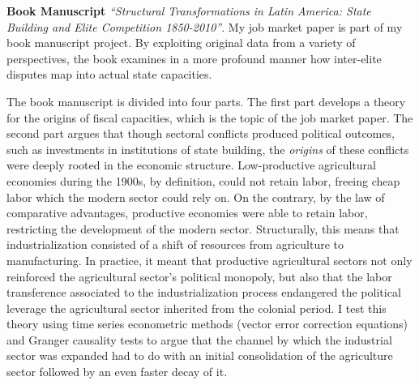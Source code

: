 \documentclass[11pt]{letter} %
\begin{document}
\begin{letter}{}
{\bf Book Manuscript} \emph{``Structural Transformations in Latin America: State Building and Elite Competition 1850-2010''}. My job market paper is part of my book manuscript project. By exploiting original data from a variety of perspectives, the book examines in a more profound manner how inter-elite disputes map into actual state capacities.

The book manuscript is divided into four parts. The first part develops a theory for the origins of fiscal capacities, which is the topic of the job market paper. The second part argues that though sectoral conflicts produced political outcomes, such as investments in institutions of state building, the \emph{origins} of these conflicts were deeply rooted in the economic structure. Low-productive agricultural economies during the 1900s, by definition, could not retain labor, freeing cheap labor which the modern sector could rely on. On the contrary, by the law of comparative advantages, productive economies were able to retain labor, restricting the development of the modern sector. Structurally, this means that industrialization consisted of a shift of resources from agriculture to manufacturing. In practice, it meant that productive agricultural sectors not only reinforced the agricultural sector's political monopoly, but also that the labor transference associated to the industrialization process endangered the political leverage the agricultural sector inherited from the colonial period. I test this theory using time series econometric methods (vector error correction equations) and Granger causality tests to argue that the channel by which the industrial sector was expanded had to do with an initial consolidation of the agriculture sector followed by an even faster decay of it.



\end{letter}
\end{document}

